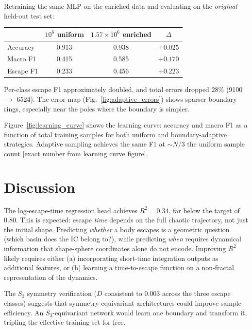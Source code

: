 \documentclass[twocolumn,prl]{revtex4-2}
\begin{document}
Retraining the same MLP on the enriched data and evaluating on the
\emph{original} held-out test set:
%
\begin{center}
\begin{tabular}{lccc}
\toprule
& $10^6$ uniform & $1.57 \times 10^6$ enriched & $\Delta$ \\
\midrule
Accuracy   & 0.913 & 0.938 & $+0.025$ \\
Macro F1   & 0.415 & 0.585 & $+0.170$ \\
Escape F1  & 0.233 & 0.456 & $+0.223$ \\
\bottomrule
\end{tabular}
\end{center}
%
Per-class escape F1 approximately doubled, and total errors dropped
$28\%$ (9100 $\to$ 6524). The error map
(Fig.~\ref{fig:adaptive_errors}) shows sparser boundary rings,
especially near the poles where the boundary is simpler.

Figure~\ref{fig:learning_curve} shows the learning curve: accuracy and
macro F1 as a function of total training samples for both uniform and
boundary-adaptive strategies. Adaptive sampling achieves the same F1 at
${\sim}N/3$ the uniform sample count [exact number from learning curve
figure].


\section{Discussion}
\label{sec:discussion}

The log-escape-time regression head achieves $R^2 = 0.34$, far below
the target of $0.80$. This is expected: escape \emph{time} depends on
the full chaotic trajectory, not just the initial shape. Predicting
\emph{whether} a body escapes is a geometric question (which basin does
the IC belong to?), while predicting \emph{when} requires dynamical
information that shape-sphere coordinates alone do not encode. Improving
$R^2$ likely requires either (a) incorporating short-time integration
outputs as additional features, or (b) learning a time-to-escape function
on a non-fractal representation of the dynamics.

The $S_3$ symmetry verification ($D$ consistent to $0.003$ across the
three escape classes) suggests that symmetry-equivariant architectures
could improve sample efficiency. An $S_3$-equivariant network would
learn one boundary and transform it, tripling the effective training set
for free.
\end{document}
